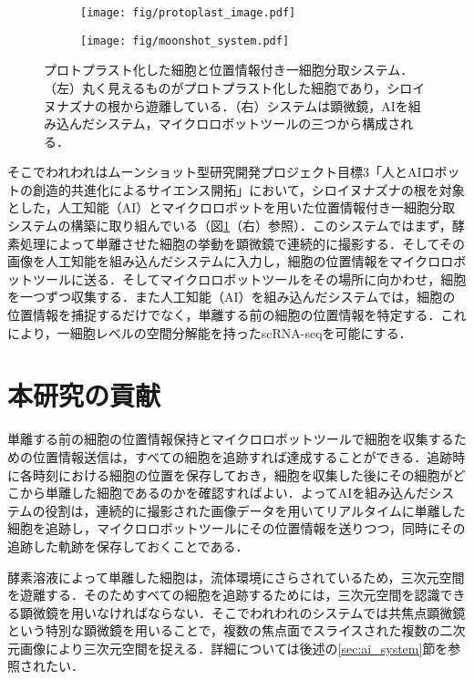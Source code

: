 \begin{figure}[t]
    \centering
    \begin{subfigure}[t]{0.27\linewidth}
        \centering
        \texttt{[image: fig/protoplast\_image.pdf]}
    \end{subfigure}
    \hfill
    \begin{subfigure}[t]{0.67\linewidth}
        \centering
        \texttt{[image: fig/moonshot\_system.pdf]}
    \end{subfigure}
    \caption[プロトプラスト化した細胞と位置情報付き一細胞分取システム]{プロトプラスト化した細胞と位置情報付き一細胞分取システム．（左）丸く見えるものがプロトプラスト化した細胞であり，シロイヌナズナの根から遊離している．（右）システムは顕微鏡，AIを組み込んだシステム，マイクロロボットツールの三つから構成される．}
    \label{fig:protoplast_and_main_system}
\end{figure}

そこでわれわれはムーンショット型研究開発プロジェクト目標3「人とAIロボットの創造的共進化によるサイエンス開拓」\cite{moonshotHarada}において，シロイヌナズナの根を対象とした，人工知能（AI）とマイクロロボット\cite{ando2024single}を用いた位置情報付き一細胞分取システムの構築に取り組んでいる（図\ref{fig:protoplast_and_main_system}（右）参照）．このシステムではまず，酵素処理によって単離させた細胞の挙動を顕微鏡で連続的に撮影する．そしてその画像を人工知能を組み込んだシステムに入力し，細胞の位置情報をマイクロロボットツールに送る．そしてマイクロロボットツールをその場所に向かわせ，細胞を一つずつ収集する．また人工知能（AI）を組み込んだシステムでは，細胞の位置情報を捕捉するだけでなく，単離する前の細胞の位置情報を特定する．これにより，一細胞レベルの空間分解能を持ったscRNA-seqを可能にする．

\section{本研究の貢献}
\label{sec:contribution}

単離する前の細胞の位置情報保持とマイクロロボットツールで細胞を収集するための位置情報送信は，すべての細胞を追跡すれば達成することができる．追跡時に各時刻における細胞の位置を保存しておき，細胞を収集した後にその細胞がどこから単離した細胞であるのかを確認すればよい．よってAIを組み込んだシステムの役割は，連続的に撮影された画像データを用いてリアルタイムに単離した細胞を追跡し，マイクロロボットツールにその位置情報を送りつつ，同時にその追跡した軌跡を保存しておくことである．

酵素溶液によって単離した細胞は，流体環境にさらされているため，三次元空間を遊離する．そのためすべての細胞を追跡するためには，三次元空間を認識できる顕微鏡を用いなければならない．そこでわれわれのシステムでは共焦点顕微鏡という特別な顕微鏡を用いることで，複数の焦点面でスライスされた複数の二次元画像により三次元空間を捉える．詳細については後述の\ref{sec:ai_system}節を参照されたい．

